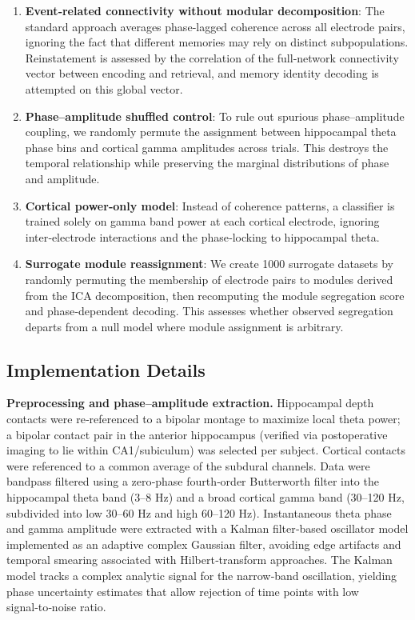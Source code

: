 \documentclass{article}
\begin{document}
\begin{enumerate}
    \item \textbf{Event‑related connectivity without modular decomposition}: The standard approach averages phase‑lagged coherence across all electrode pairs, ignoring the fact that different memories may rely on distinct subpopulations. Reinstatement is assessed by the correlation of the full‑network connectivity vector between encoding and retrieval, and memory identity decoding is attempted on this global vector.
    \item \textbf{Phase–amplitude shuffled control}: To rule out spurious phase–amplitude coupling, we randomly permute the assignment between hippocampal theta phase bins and cortical gamma amplitudes across trials. This destroys the temporal relationship while preserving the marginal distributions of phase and amplitude.
    \item \textbf{Cortical power‑only model}: Instead of coherence patterns, a classifier is trained solely on gamma band power at each cortical electrode, ignoring inter‑electrode interactions and the phase‑locking to hippocampal theta.
    \item \textbf{Surrogate module reassignment}: We create 1000 surrogate datasets by randomly permuting the membership of electrode pairs to modules derived from the ICA decomposition, then recomputing the module segregation score and phase‑dependent decoding. This assesses whether observed segregation departs from a null model where module assignment is arbitrary.
\end{enumerate}

\subsection{Implementation Details}
\textbf{Preprocessing and phase–amplitude extraction.} Hippocampal depth contacts were re‑referenced to a bipolar montage to maximize local theta power; a bipolar contact pair in the anterior hippocampus (verified via postoperative imaging to lie within CA1/subiculum) was selected per subject. Cortical contacts were referenced to a common average of the subdural channels. Data were bandpass filtered using a zero‑phase fourth‑order Butterworth filter into the hippocampal theta band (3–8 Hz) and a broad cortical gamma band (30–120 Hz, subdivided into low 30–60 Hz and high 60–120 Hz). Instantaneous theta phase and gamma amplitude were extracted with a Kalman filter‑based oscillator model implemented as an adaptive complex Gaussian filter, avoiding edge artifacts and temporal smearing associated with Hilbert‑transform approaches. The Kalman model tracks a complex analytic signal for the narrow‑band oscillation, yielding phase uncertainty estimates that allow rejection of time points with low signal‑to‑noise ratio.
\end{document}
